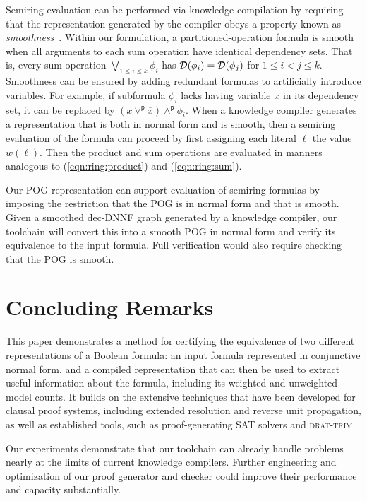 \documentclass[twoside,11pt]{article}
\newcommand{\pand}{\mathbin{\land^\textsf{p}}}
\newcommand{\por}{\mathbin{\lor^\textsf{p}}}
\newcommand{\obar}[1]{\overline{#1}}
\newcommand{\lit}{\ell}
\newcommand{\dependencyset}{{\cal D}}
\newcommand{\progname}[1]{\textsc{#1}}
\newcommand{\dtrim}{\progname{drat-trim}}
\begin{document}
Semiring evaluation can be performed via knowledge compilation
by requiring 
that the representation generated by
the compiler obeys a property known as
\emph{smoothness}~\cite{darwiche:jair:2002,shih:nips:2019}.  Within our formulation,
a partitioned-operation formula is smooth when all arguments to each
sum operation have identical dependency sets.  That is, every sum
operation $\bigvee_{1 \leq i \leq k} \phi_i$ has
$\dependencyset(\phi_i) = \dependencyset(\phi_j)$ for $1 \leq i < j
\leq k$.  Smoothness can be ensured by adding redundant formulas to
artificially introduce variables.  For example, if subformula $\phi_i$
lacks having variable $x$ in its dependency set, it can be replaced by
$(x \por \obar{x}) \pand \phi_i$.  When a knowledge compiler generates
a representation that is both in normal form and is smooth, then a semiring evaluation of the formula
can proceed by first assigning each literal $\lit$ the value $w(\lit)$.
Then the product and sum operations are evaluated in manners analogous to
(\ref{eqn:ring:product}) and
(\ref{eqn:ring:sum}).

Our POG representation can support evaluation of semiring formulas by
imposing the restriction that the POG is in normal form and that is smooth.
Given a smoothed
dec-DNNF graph generated by a knowledge compiler, our toolchain will
convert this into a smooth POG in normal form and verify its
equivalence to the input formula.  Full verification would also require checking that the POG is smooth.


\section{Concluding Remarks}
\label{sect:future}

This paper demonstrates a method for certifying the equivalence of two
different representations of a Boolean formula: an input formula
represented in conjunctive normal form, and a compiled representation
that can then be used to extract useful information about the formula,
including its weighted and unweighted model counts.  It builds on the
extensive techniques that have been developed for clausal
proof systems, including extended resolution and reverse unit propagation, as well as established tools, such as
proof-generating SAT solvers and \dtrim{}.


Our experiments demonstrate that our toolchain can already handle
problems nearly at the limits of current knowledge compilers.  Further
engineering and optimization of our proof generator and checker could
improve their performance and capacity substantially.  







\end{document}
